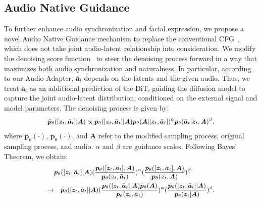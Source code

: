 \subsection{Audio Native Guidance}
\label{sec: inner_guidance}
To further enhance audio synchronization and facial expression, we propose a novel Audio Native Guidance mechanism to replace the conventional CFG~\cite{ho2022classifier}, which does not take joint audio-latent relationship into consideration.
We modify the denoising score function~\cite{song2020score} to steer the denoising process forward in a way that maximizes both audio synchronization and naturalness.
In particular, according to our Audio Adapter, $\bar{\bm{a}}_{t}$ depends on the latents and the given audio. Thus, we treat $\bar{\bm{a}}_{t}$ as an additional prediction of the DiT, guiding the diffusion model to capture the joint audio-latent distribution, conditioned on the external signal and model parameters. The denoising process is given by:
\begin{equation}\small 
\label{eq:sampling}
\begin{aligned}
     \bar{\bm{p}}_{\theta}([\bm{z}_{t}, \bar{\bm{a}}_{t}] | \bm{A})\propto\bm{p}_{\theta}([\bm{z}_{t}, \bar{\bm{a}}_{t}] | \bm{A})\bm{p}_{\theta}(\bm{A}|[\bm{z}_{t}, \bar{\bm{a}}_{t}])^{\alpha}\bm{p}_{\theta}(\bar{\bm{a}}_{t}|\bm{z}_{t}, \bm{A})^{\beta},
\end{aligned}
\end{equation}
where $\bar{\bm{p}}_{\theta}(\cdot)$, $\bm{p}_{\theta}(\cdot)$, and $\bm{A}$ refer to the modified sampling process, original sampling process, and audio. 
$\alpha$ and $\beta$ are guidance scales.
Following Bayes’ Theorem, we obtain:
\begin{equation}\small 
\label{eq:bayes}
\begin{aligned}
     &\bm{p}_{\theta}([\bm{z}_{t}, \bar{\bm{a}}_{t}] | \bm{A})(\frac{\bm{p}_{\theta}([\bm{z}_{t}, \bar{\bm{a}}_{t}],\bm{A})}{\bm{p}_{\theta}(\bm{z}_{t}, \bar{\bm{a}}_{t})})^{\alpha}(\frac{\bm{p}_{\theta}([\bm{z}_{t}, \bar{\bm{a}}_{t}],\bm{A})}{\bm{p}_{\theta}(\bm{z}_{t}, \bm{A})})^{\beta} \\
     \rightarrow&\quad \bm{p}_{\theta}([\bm{z}_{t}, \bar{\bm{a}}_{t}] | \bm{A})(\frac{\bm{p}_{\theta}([\bm{z}_{t}, \bar{\bm{a}}_{t}]|\bm{A})\bm{p}_{\theta}(\bm{A})}{\bm{p}_{\theta}(\bm{z}_{t}, \bar{\bm{a}}_{t})})^{\alpha}(\frac{\bm{p}_{\theta}([\bm{z}_{t}, \bar{\bm{a}}_{t}]|\bm{A})}{\bm{p}_{\theta}(\bm{z}_{t}|\bm{A})})^{\beta}.
\end{aligned}
\end{equation}
